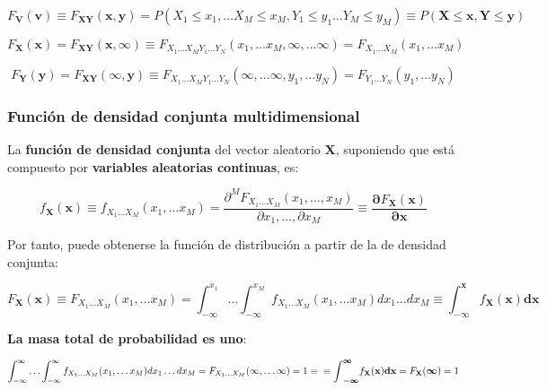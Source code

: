 \documentclass[11pt]{article}
\begin{document}
\[
F_\mathbf{V}(\mathbf{v}) \equiv F_{\mathbf{X}\mathbf{Y}}(\mathbf{x},\mathbf{y}) = 
P(X_1 \leq x_1, \ldots X_M \leq x_M, Y_1 \leq y_1 \ldots Y_M \leq y_M) \equiv 
P(\mathbf{X} \leq \mathbf{x}, \mathbf{Y} \leq \mathbf{y})
\]

\[
F_{\mathbf{X}}(\mathbf{x}) = F_{\mathbf{X}\mathbf{Y}}(\mathbf{x},\boldsymbol{\infty}) \equiv
F_{X_1\ldots X_M Y_1 \ldots Y_N}(x_1,\ldots x_M , \infty , \ldots \infty) = F_{X_1\ldots X_M}(x_1,\ldots x_M)
\]

\[
F_{\mathbf{Y}}(\mathbf{y}) = F_{\mathbf{X}\mathbf{Y}}(\mathbf{\boldsymbol{\infty}},\mathbf{y}) \equiv
F_{X_1\ldots X_M Y_1 \ldots Y_N}(\infty,\ldots \infty , y_1 , \ldots y_N) = F_{Y_1\ldots Y_N}(y_1,\ldots y_N)
\]

    \hypertarget{funciuxf3n-de-densidad-conjunta-multidimensional}{%
\subsubsection{Función de densidad conjunta
multidimensional}\label{funciuxf3n-de-densidad-conjunta-multidimensional}}

La \textbf{función de densidad conjunta} del vector aleatorio
\(\mathbf X\), suponiendo que está compuesto por \textbf{variables
aleatorias continuas}, es:

\[
f_\mathbf{X}(\mathbf{x}) \equiv f_{X_1\ldots X_M}(x_1,\ldots x_M) = \frac{\partial^{M} F_{X_1 \ldots X_M}\left(x_{1}, \ldots, x_{M}\right)}{\partial x_{1}, \ldots, \partial x_{M}} \equiv
\frac{\boldsymbol{\partial} F_\mathbf{X}(\mathbf{x})}{\boldsymbol{\partial} \mathbf{x}}
\]

Por tanto, puede obtenerse la función de distribución a partir de la de
densidad conjunta:

\[
F_\mathbf{X}(\mathbf{x}) \equiv F_{X_1\ldots X_M}(x_1,\ldots x_M) = \int_{-\infty}^{x_1} \ldots \int_{-\infty}^{x_M} f_{X_1\ldots X_M}(x_1,\ldots x_M) dx_1 \ldots dx_M \equiv 
\boldsymbol{\int}_{\boldsymbol{-\infty}}^{\mathbf{x}} f_\mathbf{X}(\mathbf{x})\mathbf{dx} 
\]

    \textbf{La masa total de probabilidad es uno}:

\[
\int_{-\infty}^{\infty} \ldots \int_{-\infty}^{\infty} f_{X_1\ldots X_M}(x_1,\ldots x_M) dx_1 \ldots dx_M = F_{X_1 \ldots X_M}(\infty,\ldots \infty) = 1 \equiv \\
\equiv \boldsymbol{\int}_{\boldsymbol{-\infty}}^{\boldsymbol{\infty}} f_\mathbf{X}(\mathbf{x})\mathbf{dx}
= F_\mathbf{X}(\boldsymbol{\infty}) = 1
\]
\end{document}

